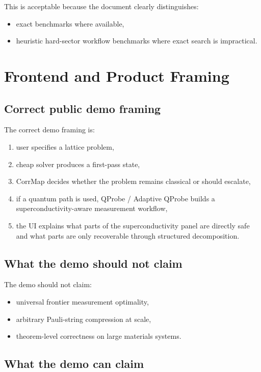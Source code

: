 \documentclass[11pt]{article}
\begin{document}
This is acceptable because the document clearly distinguishes:

\begin{itemize}
\item exact benchmarks where available,
\item heuristic hard-sector workflow benchmarks where exact search is impractical.
\end{itemize}

\section{Frontend and Product Framing}

\subsection{Correct public demo framing}

The correct demo framing is:

\begin{enumerate}[label=\arabic*.]
\item user specifies a lattice problem,
\item cheap solver produces a first-pass state,
\item CorrMap decides whether the problem remains classical or should escalate,
\item if a quantum path is used, QProbe / Adaptive QProbe builds a superconductivity-aware measurement workflow,
\item the UI explains what parts of the superconductivity panel are directly safe and what parts are only recoverable through structured decomposition.
\end{enumerate}

\subsection{What the demo should not claim}

The demo should not claim:

\begin{itemize}
\item universal frontier measurement optimality,
\item arbitrary Pauli-string compression at scale,
\item theorem-level correctness on large materials systems.
\end{itemize}

\subsection{What the demo can claim}
\end{document}

